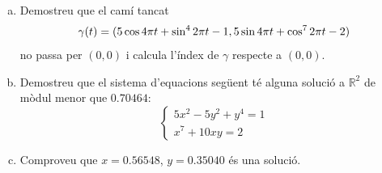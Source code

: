 \documentclass[../main.tex]{subfiles}
\begin{document}
\begin{exercici}
[Exercici 18]\label{exercici2.18} 
\begin{enumerate}[(a)]
    \item Demostreu que el camí tancat
    \begin{equation}
        \notag
        \gamma(t) = (5\cos 4\pi t + \sin^42\pi t-1,5\sin 4\pi t+\cos^72\pi t-2)
    \end{equation}
    no passa per $(0,0)$ i calcula l'índex de $\gamma$ respecte a $(0,0)$.
    \item Demostreu que el sistema d'equacions següent té alguna solució a $\mathbb{R}^2$ de mòdul menor que $0.70464$:
    \begin{equation}
        \left\{
        \begin{array}{ll}
            5x^2-5y^2+y^4=1 \\
            x^7+10xy = 2
        \end{array}
        \right.
    \end{equation}
    \item Comproveu que $x = 0.56548$, $y=0.35040$ és una solució.
\end{enumerate}
\end{exercici}
\end{document}
